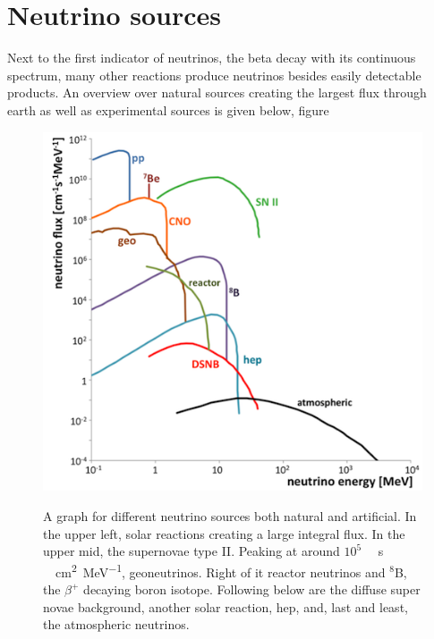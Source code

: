 	\section{Neutrino sources}
	\label{ch:Introduction:sec:neutrinoSources}
	Next to the first indicator of neutrinos, the beta decay with its continuous spectrum, many other reactions produce neutrinos besides easily detectable products. An overview over natural sources creating the largest flux through earth as well as experimental sources is given below, figure 
	\begin{figure}
		\begin{minipage}{0.65\textwidth}
			\includegraphics[width=\textwidth]{graphics/neutrinos/neutrinoSpectrum.png}
		\end{minipage}
		\begin{minipage}{0.34\textwidth}
		\caption[Neutrino sources]{~}A graph for different neutrino sources both natural and artificial. In the upper left, solar reactions creating a large integral flux. In the upper mid, the supernovae type II. Peaking at around $10^5$ \SI{}{\per\second} \SI{}{\per\square\centi\meter\per\mega\electronvolt}, geoneutrinos. Right of it reactor neutrinos and $^8$B, the $\beta^+$ decaying boron isotope. Following below are the diffuse super novae background, another solar reaction, hep, and, last and least, the atmospheric neutrinos.
		\label{fig:neutrinos:neutrinoSources}	
		\end{minipage}

		
	\end{figure}

